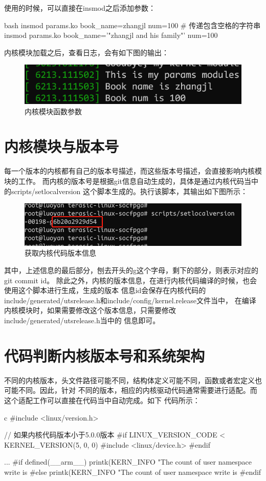 使用的时候，可以直接在insmod之后添加参数：
\begin{code-block}{bash}
insmod params.ko book_name=zhangjl num=100
# 传递包含空格的字符串
insmod params.ko book_name='"zhangjl and his family"' num=100
\end{code-block}
内核模块加载之后，查看日志，会有如下图的输出：
\begin{figure}[H]
  \centering
  \includegraphics[width=\linewidth]{params_out.png}
  \caption{内核模块函数参数}
  \label{fig:params_out}
\end{figure}

\section{内核模块与版本号}
每一个版本的内核都有自己的版本号描述，而这些版本号描述，会直接影响内核模块的工作。
而内核的版本号是根据git信息自动生成的，具体是通过内核代码当中的scripts/setlocalversion
这个脚本生成的。执行该脚本，其输出如下图所示：
\begin{figure}[H]
  \centering
  \includegraphics[width=\linewidth]{version.png}
  \caption{获取内核代码版本信息}
  \label{fig:version}
\end{figure}
其中，上述信息的最后部分，刨去开头的g这个字母，剩下的部分，则表示对应的git commit id。
除此之外，内核的版本信息，在进行内核代码编译的时候，也会使用这个脚本进行生成，生成的版本
信息id会保存在内核代码的include/generated/utsrelease.h和include/config/kernel.release文件当中，
在编译内核模块时，如果需要修改这个版本信息，只需要修改include/generated/utsrelease.h当中的
信息即可。

\section{代码判断内核版本号和系统架构}
不同的内核版本，头文件路径可能不同，结构体定义可能不同，函数或者宏定义也可能不同。因此，针对
不同的版本，相应的内核驱动代码通常需要进行适配。而这个适配工作可以直接在代码当中自动完成。如下
代码所示：
\begin{code-block}{c}
#include <linux/version.h>

// 如果内核代码版本小于5.0.0版本
#if LINUX_VERSION_CODE < KERNEL_VERSION(5, 0, 0)
#include <linux/device.h>
#endif

...
#if defined(__arm__)
        printk(KERN_INFO
                "The count of user namespace write is %
#else
        printk(KERN_INFO
                "The count of user namespace write is %
#endif
\end{code-block}


